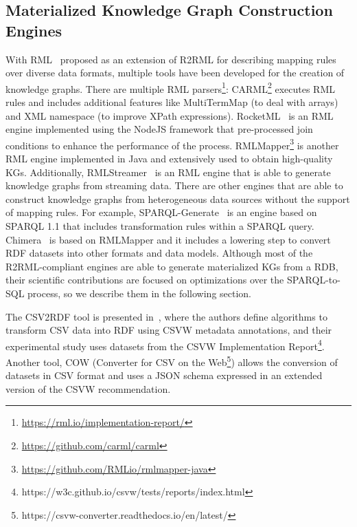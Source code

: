 \subsection{Materialized Knowledge Graph Construction Engines}
With RML~\citep{dimou2014rml} proposed as an extension of R2RML for describing mapping rules over diverse data formats, multiple tools have been developed for the creation of knowledge graphs. There are multiple RML parsers\footnote{\url{https://rml.io/implementation-report/}}: CARML\footnote{\url{https://github.com/carml/carml}} executes RML rules and includes additional features like MultiTermMap (to deal with arrays) and XML namespace (to improve XPath expressions). RocketML~\citep{csimcsek2019rocketrml} is an RML engine implemented using the NodeJS framework that pre-processed join conditions to enhance the performance of the process. RMLMapper\footnote{\url{https://github.com/RMLio/rmlmapper-java}} is another RML engine implemented in Java and extensively used to obtain high-quality KGs. Additionally, RMLStreamer~\citep{haesendonck2019parallel} is an RML engine that is able to generate knowledge graphs from streaming data. There are other engines that are able to construct knowledge graphs from heterogeneous data sources without the support of mapping rules. For example, SPARQL-Generate~\citep{lefranccois2017sparql} is an engine based on SPARQL 1.1 that includes transformation rules within a SPARQL query. Chimera~\citep{scrocca2020turning} is based on RMLMapper and it includes a lowering step to convert RDF datasets into other formats and data models. Although most of the R2RML-compliant engines are able to generate materialized KGs from a RDB, their scientific contributions are focused on optimizations over the SPARQL-to-SQL process, so we describe them in the following section.

The CSV2RDF tool is presented in~\citep{Mahmud2018}, where the authors define algorithms to transform CSV data into RDF using CSVW metadata annotations, and their experimental study uses datasets from the CSVW Implementation Report\footnote{https://w3c.github.io/csvw/tests/reports/index.html}. Another tool, COW (Converter for CSV on the Web\footnote{https://csvw-converter.readthedocs.io/en/latest/}) allows the conversion of datasets in CSV format and uses a JSON schema expressed in an extended version of the CSVW recommendation. 

